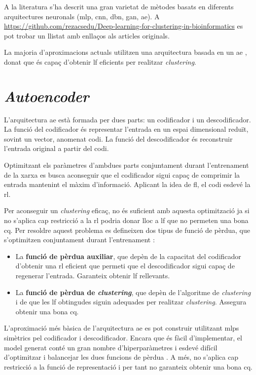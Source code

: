 \documentclass[CAT,BIB]{TFUOC}%
\begin{document}
        A la literatura s'ha descrit una gran varietat de mètodes basats en diferents arquitectures neuronals (\gls{mlp}, \gls{cnn}, \gls{dbn}, \gls{gan}, \gls{ae}). A \url{https://github.com/rezacsedu/Deep-learning-for-clustering-in-bioinformatics} \citep{Karim2021} es pot trobar un llistat amb enllaços als articles originals.

        La majoria d'aproximacions actuals utilitzen una arquitectura basada en un \gls{ae} \citep{Karim2021}, donat que és capaç d'obtenir \gls{lf} eficients per realitzar \textit{clustering}.


    \section{\textit{Autoencoder}}
    \label{s:state_ae}

        L'arquitectura \gls{ae} està formada per dues parts: un codificador i un descodificador. La funció del codificador és representar l'entrada en un espai dimensional reduït, sovint un vector, anomenat codi. La funció del descodificador és reconstruir l'entrada original a partir del codi.

        Optimitzant els paràmetres d'ambdues parts conjuntament durant l'entrenament de la xarxa es busca aconseguir que el codificador sigui capaç de comprimir la entrada mantenint el màxim d'informació. Aplicant la idea de \gls{fl}, el codi esdevé la \gls{rl}.

        Per aconseguir un \textit{clustering} eficaç, no és suficient amb aquesta optimització ja si no s'aplica cap restricció a la \gls{rl} podria donar lloc a \gls{lf} que no permeten una bona \gls{cq}. Per resoldre aquest problema es defineixen dos tipus de funció de pèrdua, que s'optimitzen conjuntament durant l'entrenament \citep{Min2018}:
        \begin{itemize}
            \item La \textbf{funció de pèrdua auxiliar}, que depèn de la capacitat del codificador d'obtenir una \gls{rl} eficient que permeti que el descodificador sigui capaç de regenerar l'entrada. Garanteix obtenir \gls{lf} rellevants.
            \item La \textbf{funció de pèrdua de \textit{clustering}}, que depèn de l'algoritme de \textit{clustering} i de que les \gls{lf} obtingudes siguin adequades per realitzar \textit{clustering}. Assegura obtenir una bona \gls{cq}.
        \end{itemize}

        L'aproximació més bàsica de l'arquitectura \gls{ae} es pot construir utilitzant \glspl{mlp} simètrics pel codificador i descodificador. Encara que és fàcil d'implementar, el model generat conté un gran nombre d'hiperparàmetres i esdevé difícil d'optimitzar i balancejar les dues funcions de pèrdua \citep{Karim2021}. A més, no s'aplica cap restricció a la funció de representació i per tant no garanteix obtenir una bona \gls{cq}.
\end{document}
